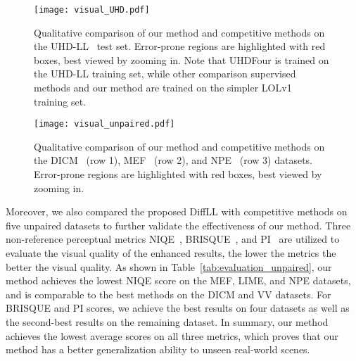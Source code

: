 \begin{figure*}[!t]
	\centering
	\texttt{[image: visual\_UHD.pdf]}
	\caption{Qualitative comparison of our method and competitive methods on the UHD-LL~\cite{UHD_ICLR} test set. Error-prone regions are highlighted with red boxes, best viewed by zooming in. Note that UHDFour is trained on the UHD-LL training set, while other comparison supervised methods and our method are trained on the simpler LOLv1~\cite{RetinexNet} training set.}
	\label{fig:visual_UHD}
\end{figure*}
\begin{figure*}[!t]
	\centering
	\texttt{[image: visual\_unpaired.pdf]}
	\caption{Qualitative comparison of our method and competitive methods on the DICM~\cite{DICM} (row 1), MEF~\cite{MEF} (row 2), and NPE~\cite{NPE} (row 3) datasets. Error-prone regions are highlighted with red boxes, best viewed by zooming in.}
	\label{fig:visual_compare_unpaired}
\end{figure*}

Moreover, we also compared the proposed DiffLL with competitive methods on five unpaired datasets to further validate the effectiveness of our method. Three non-reference perceptual metrics NIQE~\cite{NIQE}, BRISQUE~\cite{BRISQUE}, and PI~\cite{PI} are utilized to evaluate the visual quality of the enhanced results, the lower the metrics the better the visual quality. As shown in Table~\ref{tab:evaluation_unpaired}, our method achieves the lowest NIQE score on the MEF, LIME, and NPE datasets, and is comparable to the best methods on the DICM and VV datasets. For BRISQUE and PI scores, we achieve the best results on four datasets as well as the second-best results on the remaining dataset. In summary, our method achieves the lowest average scores on all three metrics, which proves that our method has a better generalization ability to unseen real-world scenes.

